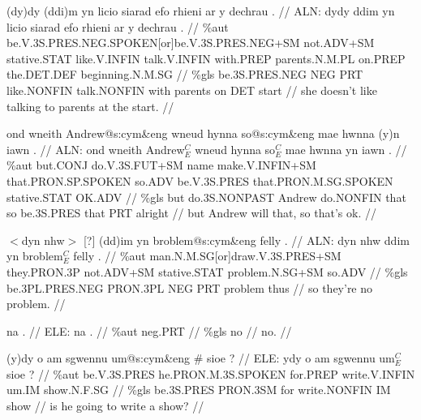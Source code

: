 \documentclass[a4paper,10pt]{article}
\begin{document}
\ex
\begingl[lingstyle=gergl]
\glchat (dy)dy (ddi)m yn licio siarad efo rhieni ar y dechrau . //
\glsurface ALN:  dydy ddim yn licio siarad efo rhieni ar y dechrau .  //
\glauto \%aut  be{\scriptsize .V.3S.PRES.NEG.SPOKEN[or]be.V.3S.PRES.NEG+SM} not{\scriptsize .ADV+SM} stative{\scriptsize .STAT} like{\scriptsize .V.INFIN} talk{\scriptsize .V.INFIN} with{\scriptsize .PREP} parents{\scriptsize .N.M.PL} on{\scriptsize .PREP} the{\scriptsize .DET.DEF} beginning{\scriptsize .N.M.SG}   //
\glmanual \%gls  be{\scriptsize .3S.PRES.NEG} NEG PRT like{\scriptsize .NONFIN} talk{\scriptsize .NONFIN} with parents on DET start   //
\gleng she doesn't like talking to parents at the start. //
\endgl
\xe

\ex
\begingl[lingstyle=gergl]
\glchat ond wneith Andrew@s:cym\&eng wneud hynna so@s:cym\&eng mae hwnna (y)n iawn . //
\glsurface ALN:  ond wneith Andrew$^{C}_{E}$ wneud hynna so$^{C}_{E}$ mae hwnna yn iawn .  //
\glauto \%aut  but{\scriptsize .CONJ} do{\scriptsize .V.3S.FUT+SM} name make{\scriptsize .V.INFIN+SM} that{\scriptsize .PRON.SP.SPOKEN} so{\scriptsize .ADV} be{\scriptsize .V.3S.PRES} that{\scriptsize .PRON.M.SG.SPOKEN} stative{\scriptsize .STAT} OK{\scriptsize .ADV}   //
\glmanual \%gls  but do{\scriptsize .3S.NONPAST} Andrew do{\scriptsize .NONFIN} that so be{\scriptsize .3S.PRES} that PRT alright   //
\gleng but Andrew will that, so that's ok. //
\endgl
\xe

\ex
\begingl[lingstyle=gergl]
\glchat $<$dyn nhw$>$ [?] (dd)im yn broblem@s:cym\&eng felly . //
\glsurface ALN:  dyn nhw ddim yn broblem$^{C}_{E}$ felly .  //
\glauto \%aut  man{\scriptsize .N.M.SG[or]draw.V.3S.PRES+SM} they{\scriptsize .PRON.3P} not{\scriptsize .ADV+SM} stative{\scriptsize .STAT} problem{\scriptsize .N.SG+SM} so{\scriptsize .ADV}   //
\glmanual \%gls  be{\scriptsize .3PL.PRES.NEG} PRON{\scriptsize .3PL} NEG PRT problem thus   //
\gleng so they're no problem. //
\endgl
\xe

\ex
\begingl[lingstyle=gergl]
\glchat na . //
\glsurface ELE:  na .  //
\glauto \%aut  neg{\scriptsize .PRT}   //
\glmanual \%gls  no   //
\gleng no. //
\endgl
\xe

\ex
\begingl[lingstyle=gergl]
\glchat (y)dy o am sgwennu um@s:cym\&eng \# sioe ? //
\glsurface ELE:  ydy o am sgwennu um$^{C}_{E}$ sioe ?  //
\glauto \%aut  be{\scriptsize .V.3S.PRES} he{\scriptsize .PRON.M.3S.SPOKEN} for{\scriptsize .PREP} write{\scriptsize .V.INFIN} um{\scriptsize .IM} show{\scriptsize .N.F.SG}   //
\glmanual \%gls  be{\scriptsize .3S.PRES} PRON{\scriptsize .3SM} for write{\scriptsize .NONFIN} IM show   //
\gleng is he going to write a show? //
\endgl
\xe
\end{document}
